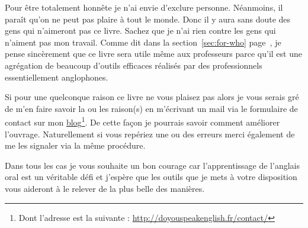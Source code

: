 Pour être totalement honnête je n'ai envie d'exclure
personne. Néanmoins, il paraît qu'on ne peut pas plaire à tout le
monde. Donc il y aura sans doute des gens qui n'aimeront pas ce
livre. Sachez que je n'ai rien contre les gens qui n'aiment pas mon
travail. Comme dit dans la section~\ref{sec:for-who}
page~\pageref{sec:for-who}, je pense sincèrement que ce livre sera
utile même aux professeurs parce qu'il est une agrégation de beaucoup
d'outils efficaces réalisés par des professionnels essentiellement
anglophones.

Si pour une quelconque raison ce livre ne vous plaisez pas alors je
vous serais gré de m'en faire savoir la ou les raison(s) en m'écrivant un mail
via le formulaire de contact sur mon \href{http://doyouspeakenglish.fr/contact/}{blog}\footnote{Dont l'adresse est
  la suivante : \url{http://doyouspeakenglish.fr/contact/}}. De cette
façon je pourrais savoir comment améliorer l'ouvrage. Naturellement si
vous repériez une ou des erreurs merci également de me les signaler
via la même procédure.

Dans tous les cas je vous souhaite un bon courage car l'apprentissage
de l'anglais oral est un véritable défi et j'espère que les outils que
je mets à votre disposition vous aideront à le relever de la plus
belle des manières.

\begin{center}
\end{center}

\newpage
\minitoc

